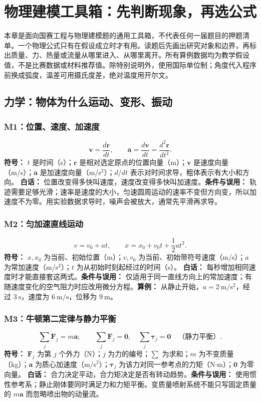 \chapter{物理建模工具箱：先判断现象，再选公式}
本章是面向国赛工程与物理建模题的通用工具箱，不代表任何一届题目的押题清单。一个物理公式只有在假设成立时才有用。读题后先画出研究对象和边界，再标出质量、力、热量或流量从哪里进入、从哪里离开。所有算例数据均为教学假设值，不是比赛数据或材料推荐值。除特别说明外，使用国际单位制；角度代入程序前换成弧度，温差可用摄氏度差，绝对温度用开尔文。

\section{力学：物体为什么运动、变形、振动}
\subsection{M1：位置、速度、加速度}
\begin{equation}
\mathbf v=\frac{d\mathbf r}{dt},\qquad \mathbf a=\frac{d\mathbf v}{dt}=\frac{d^2\mathbf r}{dt^2}.
\end{equation}
\textbf{符号：} $t$ 是时间（s）；$\mathbf r$ 是相对选定原点的位置向量（m）；$\mathbf v$ 是速度向量（m/s）；$\mathbf a$ 是加速度向量（m/s$^2$）；$d/dt$ 表示对时间求导，粗体表示有大小和方向。
\textbf{白话：} 位置改变得多快叫速度，速度改变得多快叫加速度。\textbf{条件与误用：} 轨迹需要足够光滑；速率是速度的大小，匀速圆周运动的速率不变但方向变，所以加速度不为零。用实验数据求导时，噪声会被放大，通常先平滑再求导。

\subsection{M2：匀加速直线运动}
\begin{equation}
v=v_0+at,\qquad x=x_0+v_0t+\frac12at^2.
\end{equation}
\textbf{符号：} $x,x_0$ 为当前、初始位置（m）；$v,v_0$ 为当前、初始带符号速度（m/s）；$a$ 为常加速度（m/s$^2$）；$t$ 为从初始时刻起经过的时间（s）。
\textbf{白话：} 每秒增加相同速度时才能直接套这两式。\textbf{条件与误用：} 仅适用于同一直线方向上的常加速度；有随速度变化的空气阻力时应改用微分方程。\textbf{算例：} 从静止开始，$a=2\ \mathrm{m/s^2}$，经过 $3\ \mathrm{s}$，速度为 $6\ \mathrm{m/s}$，位移为 $9\ \mathrm m$。

\subsection{M3：牛顿第二定律与静力平衡}
\begin{equation}
\sum_j\mathbf F_j=m\mathbf a;\qquad \sum_j\mathbf F_j=\mathbf0,\quad \sum_j\boldsymbol\tau_j=\mathbf0\quad\text{（静力平衡）}.
\end{equation}
\textbf{符号：} $\mathbf F_j$ 为第 $j$ 个外力（N）；$j$ 为力的编号；$\sum$ 为求和；$m$ 为不变质量（kg）；$\mathbf a$ 为质心加速度（m/s$^2$）；$\boldsymbol\tau_j$ 为该力对同一参考点的力矩（N$\cdot$m）；$\mathbf0$ 为零向量。
\textbf{白话：} 合力决定平动，合力矩决定是否有转动趋势。\textbf{条件与误用：} 使用惯性参考系；静止刚体要同时满足力和力矩平衡。变质量喷射系统不能只写固定质量的 $m\mathbf a$ 而忽略喷出物的动量流。

